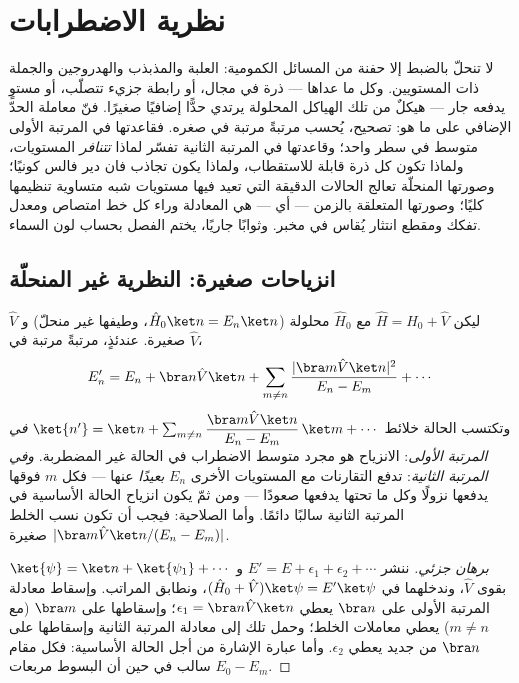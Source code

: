 \chapter{نظرية الاضطرابات}\label{ch:b3:perturbation-theory}

لا تنحلّ بالضبط إلا حفنة من المسائل الكمومية: العلبة
والمذبذب والهدروجين والجملة ذات المستويين. وكل ما عداها --- ذرة
في مجال، أو رابطة جزيء تتصلّب، أو مستوٍ يدفعه
جار --- هيكلٌ من تلك الهياكل المحلولة يرتدي حدًّا
إضافيًا صغيرًا.  فنّ معاملة الحدّ
الإضافي على ما هو: تصحيح، يُحسب مرتبةً مرتبة في
صغره. فقاعدتها في المرتبة الأولى متوسط في سطر واحد؛ وقاعدتها في
المرتبة الثانية تفسّر لماذا \emph{تتنافر} المستويات، ولماذا تكون
كل ذرة قابلة للاستقطاب، ولماذا يكون تجاذب فان دير فالس كونيًا؛
وصورتها المنحلّة تعالج الحالات الدقيقة التي تعيد فيها مستويات
شبه متساوية تنظيمها كليًا؛ وصورتها المتعلقة بالزمن --- أي  --- هي المعادلة وراء كل خط امتصاص ومعدل
تفكك ومقطع انتثار يُقاس في مخبر. وثوابًا جاريًا،
يختم الفصل بحساب لون السماء.

\section{انزياحات صغيرة: النظرية غير المنحلّة}

\begin{theorem}\label{thm:b3:perturbation-theory:corrections}
ليكن $\hat H = \hat H_0 + \hat V$ مع $\hat H_0$ محلولة
($\hat H_0\ket n = E_n\ket n$، وطيفها غير منحلّ) و $\hat V$
صغيرة. عندئذٍ، مرتبةً مرتبة في $\hat V$،
\[
E_n' = E_n + \bra n\hat V\ket n
 + \sum_{m \neq n}\frac{|\bra m\hat V\ket n|^2}{E_n - E_m}
 + \cdots
\]
وتكتسب الحالة خلائط $\ket{n'} = \ket n + \sum_{m\neq
n}\dfrac{\bra m\hat V\ket n}{E_n - E_m}\,\ket m + \cdots$
\emph{في المرتبة الأولى}: الانزياح هو مجرد متوسط
الاضطراب في الحالة غير المضطربة. \emph{وفي المرتبة الثانية}:
تدفع التقارنات مع المستويات الأخرى $E_n$ \emph{بعيدًا} عنها ---
فكل $m$ فوقها يدفعها نزولًا وكل ما تحتها يدفعها صعودًا --- ومن ثمّ
يكون انزياح الحالة الأساسية في المرتبة الثانية سالبًا دائمًا. وأما الصلاحية:
فيجب أن تكون نسب الخلط $|\bra m\hat V\ket n/(E_n - E_m)|$ صغيرة.
\end{theorem}

\begin{proof}[برهان جزئي]
ننشر $E' = E + \epsilon_1 + \epsilon_2 + \cdots$ و $\ket{\psi} =
\ket n + \ket{\psi_1} + \cdots$ بقوى $\hat V$، وندخلهما في
$(\hat H_0 + \hat V)\ket\psi = E'\ket\psi$، ونطابق المراتب.
وإسقاط معادلة المرتبة الأولى على $\bra n$ يعطي $\epsilon_1 =
\bra n\hat V\ket n$؛ وإسقاطها على $\bra m$ (مع $m \neq n$) يعطي
معاملات الخلط؛ وحمل تلك إلى معادلة المرتبة الثانية
وإسقاطها على $\bra n$ من جديد يعطي $\epsilon_2$. وأما عبارة
الإشارة من أجل الحالة الأساسية: فكل مقام $E_0 - E_m$
سالب في حين أن البسوط مربعات.
\end{proof}

